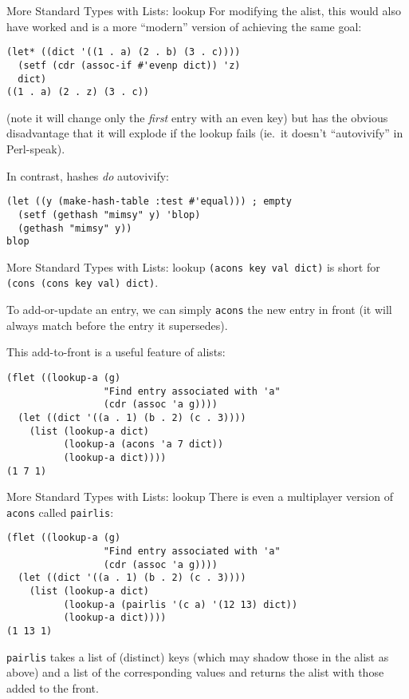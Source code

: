 \documentclass[presentation]{beamer}
\begin{document}
\begin{frame}[fragile]{More Standard Types with Lists: lookup}
For modifying the alist, this would also have worked and is a more ``modern'' version of achieving the same goal:
\begin{verbatim}
(let* ((dict '((1 . a) (2 . b) (3 . c))))
  (setf (cdr (assoc-if #'evenp dict)) 'z)
  dict)
((1 . a) (2 . z) (3 . c))
\end{verbatim}
(note it will change only the \emph{first} entry with an even key) but has the obvious disadvantage that it will explode if the lookup fails (ie.\ it doesn't ``autovivify'' in Perl-speak).

\medskip
In contrast, hashes \emph{do} autovivify:
\begin{verbatim}
(let ((y (make-hash-table :test #'equal))) ; empty
  (setf (gethash "mimsy" y) 'blop)
  (gethash "mimsy" y))
blop
\end{verbatim}
\end{frame}

\begin{frame}[fragile]{More Standard Types with Lists: lookup}
\texttt{(acons key val dict)} is short for \texttt{(cons (cons key val) dict)}.

\medskip
  To add-or-update an entry, we can simply \texttt{acons} the new entry in front (it will always match before the entry it supersedes).

  \medskip
  This add-to-front is a useful feature of alists:
\begin{verbatim}
(flet ((lookup-a (g)
                 "Find entry associated with 'a"
                 (cdr (assoc 'a g))))
  (let ((dict '((a . 1) (b . 2) (c . 3))))
    (list (lookup-a dict)
          (lookup-a (acons 'a 7 dict))
          (lookup-a dict))))
(1 7 1)
\end{verbatim}
\end{frame}

\begin{frame}[fragile]{More Standard Types with Lists: lookup}
There is even a multiplayer version of \texttt{acons} called \texttt{pairlis}: 

\begin{verbatim}
(flet ((lookup-a (g)
                 "Find entry associated with 'a"
                 (cdr (assoc 'a g))))
  (let ((dict '((a . 1) (b . 2) (c . 3))))
    (list (lookup-a dict)
          (lookup-a (pairlis '(c a) '(12 13) dict))
          (lookup-a dict))))
(1 13 1)
\end{verbatim}

\texttt{pairlis} takes a list of (distinct) keys (which may shadow those in the alist as above) and a list of the corresponding values and returns the alist with those added to the front.
\end{frame}
\end{document}
